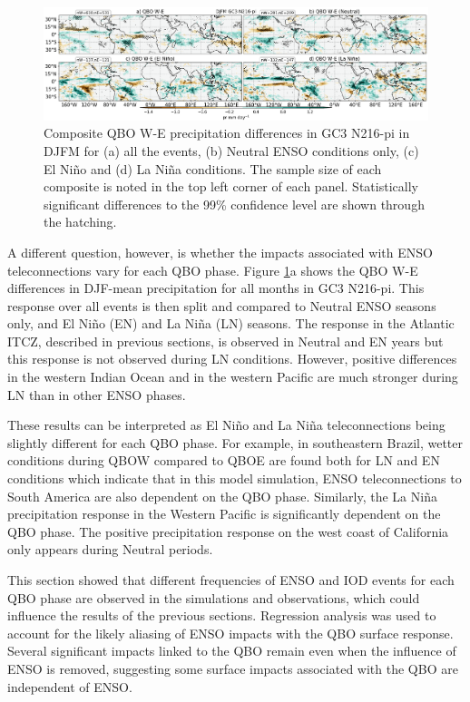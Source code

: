 \begin{figure}[t!]
\centering
 \includegraphics[width=\linewidth]{figures/ensoqboprdjfm.png}
\caption[Precipitation response to QBO W-E for GC3 N216-pi under different QBO phases.]{  Composite QBO W-E precipitation differences in GC3 N216-pi in DJFM for (a) all the events, (b) Neutral ENSO conditions only, (c) El Niño and (d) La Niña conditions. The sample size of each composite is noted in the top left corner of each panel. Statistically significant differences to the 99\% confidence level are shown through the hatching. }
\label{fig:qboenso}
\end{figure}

A different question, however, is whether the impacts associated with ENSO teleconnections vary for each QBO phase. Figure \ref{fig:qboenso}a shows the QBO W-E differences in DJF-mean precipitation for all months in GC3 N216-pi. This response over all events is then split and compared to Neutral ENSO seasons only, and El Niño (EN) and La Niña (LN) seasons.  The response in the Atlantic ITCZ, described in previous sections, is observed in Neutral and EN years but this response is not observed during LN conditions. However,  positive differences in the western Indian Ocean and in the western Pacific are much stronger during LN than in other ENSO phases. 

These results can be interpreted as El Niño and La Niña teleconnections being slightly different for each QBO phase. For example, in southeastern Brazil, wetter conditions during QBOW compared to QBOE are found both for LN and EN conditions which indicate that in this model simulation, ENSO teleconnections to South America are also dependent on the QBO phase. Similarly, the La Niña precipitation response in the Western Pacific is significantly dependent on the QBO phase.  The positive precipitation response on the west coast of California only appears during Neutral periods. 

This section showed that different frequencies of ENSO and IOD events for each QBO phase are observed in the simulations and observations, which could influence the results of the previous sections.
Regression analysis was used to account for the likely aliasing of ENSO impacts with the QBO surface response. Several significant impacts linked to the QBO remain even when the influence of ENSO is removed, suggesting some surface impacts associated with the QBO  are independent of ENSO.

